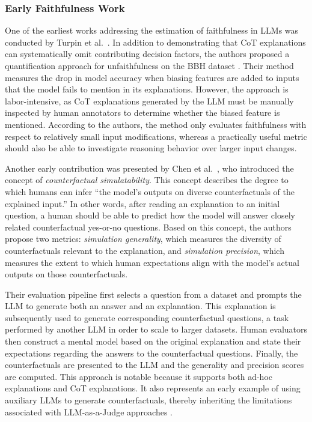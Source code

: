 \subsubsection{Early Faithfulness Work}
One of the earliest works addressing the estimation of faithfulness in LLMs was conducted by Turpin et al.~\cite{turpinLanguageModelsDont2023}. In addition to demonstrating that CoT explanations can systematically omit contributing decision factors, the authors proposed a quantification approach for unfaithfulness on the BBH dataset \cite{suzgunChallengingBIGBenchTasks2023}. Their method measures the drop in model accuracy when biasing features are added to inputs that the model fails to mention in its explanations. However, the approach is labor-intensive, as CoT explanations generated by the LLM must be manually inspected by human annotators to determine whether the biased feature is mentioned. According to the authors, the method only evaluates faithfulness with respect to relatively small input modifications, whereas a practically useful metric should also be able to investigate reasoning behavior over larger input changes.

Another early contribution was presented by Chen et al.~\cite{chenModelsExplainThemselves2024}, who introduced the concept of \emph{counterfactual simulatability}. This concept describes the degree to which humans can infer \enquote{the model's outputs on diverse counterfactuals of the explained input.} In other words, after reading an explanation to an initial question, a human should be able to predict how the model will answer closely related counterfactual yes-or-no questions. Based on this concept, the authors propose two metrics: \textit{simulation generality}, which measures the diversity of counterfactuals relevant to the explanation, and \textit{simulation precision}, which measures the extent to which human expectations align with the model’s actual outputs on those counterfactuals.

Their evaluation pipeline first selects a question from a dataset and prompts the LLM to generate both an answer and an explanation. This explanation is subsequently used to generate corresponding counterfactual questions, a task performed by another LLM in order to scale to larger datasets. Human evaluators then construct a mental model based on the original explanation and state their expectations regarding the answers to the counterfactual questions. Finally, the counterfactuals are presented to the LLM and the generality and precision scores are computed. This approach is notable because it supports both ad-hoc explanations and CoT explanations. It also represents an early example of using auxiliary LLMs to generate counterfactuals, thereby inheriting the limitations associated with LLM-as-a-Judge approaches \cite{mattonWalkTalkMeasuring2024}.

